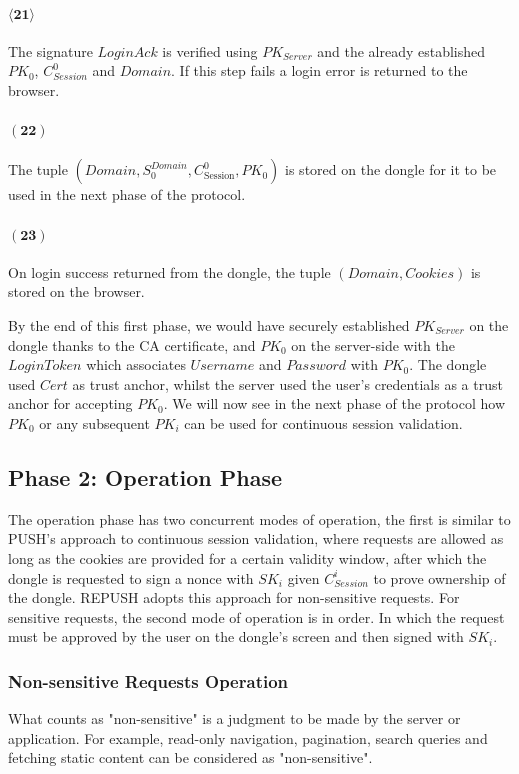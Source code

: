 \paragraph{$\boldsymbol{\langle21\rangle}$} The signature $LoginAck$ is verified using $PK_{Server}$ and the already established $PK_0$, $C_{Session}^0$ and $Domain$. If this step fails a login error is returned to the browser.
\paragraph{$\boldsymbol{(22)}$} The tuple $(Domain, S_0^{Domain}, C^0_{\text{Session}}, PK_0)$ is stored on the dongle for it to be used in the next phase of the protocol.

\paragraph{$\boldsymbol{(23)}$} On login success returned from the dongle, the tuple $(Domain, Cookies)$ is stored on the browser.

By the end of this first phase, we would have securely established $PK_{Server}$ on the dongle thanks to the CA certificate, and $PK_0$ on the server-side with the $LoginToken$ which associates $Username$ and $Password$ with $PK_0$. The dongle used $Cert$ as trust anchor, whilst the server used the user's credentials as a trust anchor for accepting $PK_0$. We will now see in the next phase of the protocol how $PK_0$ or any subsequent $PK_i$ can be used for continuous session validation.

\subsection{Phase 2: Operation Phase}
The operation phase has two concurrent modes of operation, the first is similar to PUSH's approach to continuous session validation, where requests are allowed as long as the cookies are provided for a certain validity window, after which the dongle is requested to sign a nonce with $SK_i$ given $C_{Session}^i$ to prove ownership of the dongle. REPUSH adopts this approach for non-sensitive requests. For sensitive requests, the second mode of operation is in order. In which the request must be approved by the user on the dongle's screen and then signed with $SK_i$. 
\subsubsection{Non-sensitive Requests Operation}
What counts as "non-sensitive" is a judgment to be made by the server or application. For example, read-only navigation, pagination, search queries and fetching static content can be considered as "non-sensitive". 

